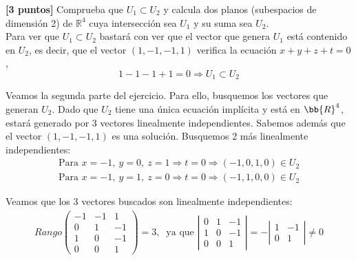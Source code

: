 \documentclass[12pt]{article}
\begin{document}
    \begin{ejercicio}\textbf{[3 puntos]}
    Comprueba que $U_1\subset U_2$ y calcula dos planos (subespacios de dimensión 2) de $\mathbb{R}^4$ cuya intersección sea $U_1$ y su suma sea $U_2$.\\
    
    Para ver que $U_1\subset U_2$ bastará con ver que el vector que genera $U_1$ está contenido en $U_2$, es decir, que el vector $(1,-1,-1,1)$ verifica la ecuación $x+y+z+t=0$,
    \[1-1-1+1=0 \Rightarrow U_1 \subset U_2\]

    Veamos la segunda parte del ejercicio. Para ello, busquemos los vectores que generan $U_2$. Dado que $U_2$ tiene una única ecuación implícita y está en $\bb{R}^4$, estará generado por 3 vectores linealmente independientes.
    Sabemos además que el vector $(1, -1, -1, 1)$ es una solución. Busquemos 2 más linealmente independientes:
    \begin{gather*}
        \text{Para }x=-1,\ y=0,\ z=1 \Rightarrow t=0 \Rightarrow (-1,0,1,0)\in U_2\\
        \text{Para }x=-1,\ y=1,\ z=0 \Rightarrow t=0 \Rightarrow (-1,1,0,0)\in U_2
    \end{gather*}

    Veamos que los 3 vectores buscados son linealmente independientes:
    \begin{gather*}
        Rango\left(\begin{array}{rrr}-1&-1&1\\0&1&-1\\1&0&-1\\0&0&1\end{array}\right)=3,\  \text{ ya que }
        \left|\begin{array}{rrr}0&1&-1\\1&0&-1\\0&0&1\end{array}\right|=
        - \left|\begin{array}{rr}1&-1\\0&1\end{array}\right|\neq 0
    \end{gather*}


\end{ejercicio}
\end{document}
